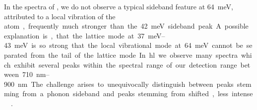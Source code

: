 		In the spectra of \vl, we do not observe a typical \siv sideband feature at \SI{64}{meV}, attributed to a local vibration of the \si atom, frequently much stronger than the  \SI{42}{meV} sideband peak.
		A possible explanation is, that the lattice mode at \SIrange{37}{43}{meV} is so strong that the local vibrational mode at \SI{64}{meV} cannot be separated from the tail of the lattice mode.
		In \hl we observe many spectra which exhibit several peaks within the spectral range of our detection range between \SIrange{710}{900}{nm}.
		The challenge arises to unequivocally distinguish between peaks stemming from a phonon sideband and peaks stemming from shifted, less intense \siv \ZPLs.

